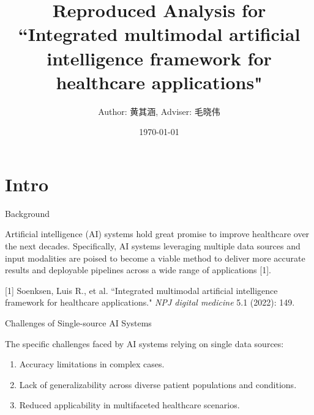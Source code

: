 \documentclass{sintefbeamer}
\title{\large Reproduced Analysis for ``Integrated multimodal artificial intelligence framework for healthcare applications"}
\subtitle{Author: 黄其涵, Adviser: 毛晓伟}
\date{\today}
\theoremstyle{definition}
\begin{document}
\maketitle


\section{Intro}

\begin{frame}{Background}

\justifying
Artificial intelligence (AI) systems hold great promise to improve healthcare over the next decades. Specifically, AI systems leveraging multiple data sources and input modalities are poised to become a viable method to deliver more accurate results and deployable pipelines across a wide range of applications [1].

\vspace{0.7cm}

\tiny [1] Soenksen, Luis R., et al. ``Integrated multimodal artificial intelligence framework for healthcare applications." \textit{NPJ digital medicine} 5.1 (2022): 149.


\end{frame}

\begin{frame}{Challenges of Single-source AI Systems}

The specific challenges faced by AI systems relying on single data sources:
\begin{enumerate}
\item Accuracy limitations in complex cases.
\item Lack of generalizability across diverse patient populations and conditions.
\item Reduced applicability in multifaceted healthcare scenarios.
\end{enumerate}

\end{frame}
\end{document}
